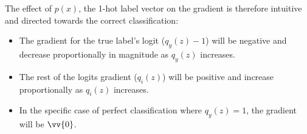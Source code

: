 \documentclass{article}
\begin{document}
The effect of $p(x)$, the 1-hot label vector on the gradient is therefore intuitive and directed towards the correct classification:
\begin{itemize}
  \item The gradient for the true label's logit ($q_y(z) - 1$) will be negative and decrease proportionally in magnitude as $q_y(z)$ increases.
  \item The rest of the logits gradient ($q_i(z)$) will be positive and increase proportionally as $q_i(z)$ increases.
  \item In the specific case of perfect classification where $q_y(z)=1$, the gradient will be $\vv{0}$.
\end{itemize}

\end{document}
